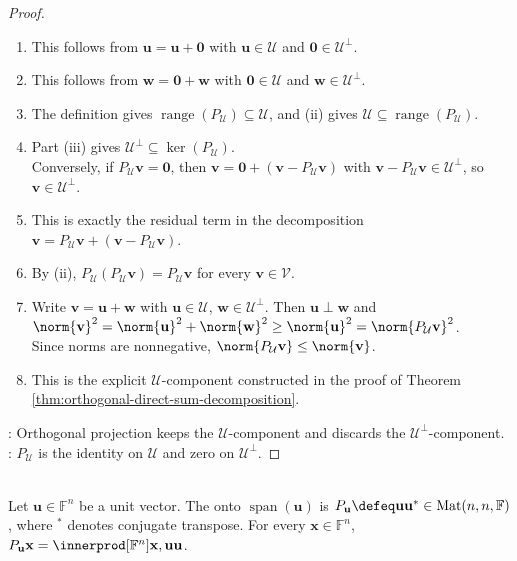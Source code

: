 \begin{proposition}
\begin{proof}
\begin{enumerate}[label=(\roman*)]
By uniqueness of the orthogonal decomposition, $P_{\mathcal{U}}(a\mathbf{v}_1+\mathbf{v}_2)=aP_{\mathcal{U}}\mathbf{v}_1+P_{\mathcal{U}}\mathbf{v}_2$.
\item This follows from $\mathbf{u}=\mathbf{u}+\mathbf{0}$ with $\mathbf{u}\in\mathcal{U}$ and $\mathbf{0}\in\mathcal{U}^{\perp}$.
\item This follows from $\mathbf{w}=\mathbf{0}+\mathbf{w}$ with $\mathbf{0}\in\mathcal{U}$ and $\mathbf{w}\in\mathcal{U}^{\perp}$.
\item The definition gives $\operatorname{range}(P_{\mathcal{U}})\subseteq\mathcal{U}$, and (ii) gives $\mathcal{U}\subseteq\operatorname{range}(P_{\mathcal{U}})$.
\item Part (iii) gives $\mathcal{U}^{\perp}\subseteq\ker(P_{\mathcal{U}})$.\\
Conversely, if $P_{\mathcal{U}}\mathbf{v}=\mathbf{0}$, then $\mathbf{v}=\mathbf{0}+(\mathbf{v}-P_{\mathcal{U}}\mathbf{v})$ with $\mathbf{v}-P_{\mathcal{U}}\mathbf{v}\in\mathcal{U}^{\perp}$, so $\mathbf{v}\in\mathcal{U}^{\perp}$.
\item This is exactly the residual term in the decomposition $\mathbf{v}=P_{\mathcal{U}}\mathbf{v}+(\mathbf{v}-P_{\mathcal{U}}\mathbf{v})$.
\item By (ii), $P_{\mathcal{U}}(P_{\mathcal{U}}\mathbf{v})=P_{\mathcal{U}}\mathbf{v}$ for every $\mathbf{v}\in\mathcal{V}$.
\item Write $\mathbf{v}=\mathbf{u}+\mathbf{w}$ with $\mathbf{u}\in\mathcal{U}$, $\mathbf{w}\in\mathcal{U}^{\perp}$. Then $\mathbf{u}\perp\mathbf{w}$ and $\norm{\mathbf{v}}^2=\norm{\mathbf{u}}^2+\norm{\mathbf{w}}^2\geq\norm{\mathbf{u}}^2=\norm{P_{\mathcal{U}}\mathbf{v}}^2$.\\
Since norms are nonnegative, $\norm{P_{\mathcal{U}}\mathbf{v}}\leq\norm{\mathbf{v}}$.
\item This is the explicit $\mathcal{U}$-component constructed in the proof of Theorem \ref{thm:orthogonal-direct-sum-decomposition}.
\end{enumerate}
: Orthogonal projection keeps the $\mathcal{U}$-component and discards the $\mathcal{U}^{\perp}$-component.\\
: $P_{\mathcal{U}}$ is the identity on $\mathcal{U}$ and zero on $\mathcal{U}^{\perp}$.
\end{proof}
\end{proposition}

\begin{definition} \label{def:rank-one-projection-matrix} \\
Let $\mathbf{u}\in\mathbb{F}^n$ be a unit vector. The  onto $\operatorname{span}(\mathbf{u})$ is $P_{\mathbf{u}}\defeq \mathbf{u}\mathbf{u}^*\in\operatorname{Mat}(n,n,\mathbb{F})$, where $^*$ denotes conjugate transpose. For every $\mathbf{x}\in\mathbb{F}^n$, $P_{\mathbf{u}}\mathbf{x}=\innerprod[\mathbb{F}^n]{\mathbf{x},\mathbf{u}}\mathbf{u}$.
\end{definition}

